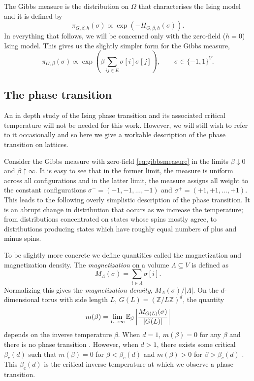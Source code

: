 	The Gibbs measure is the distribution on $\Omega$ that characterises the Ising model and it is defined by
	\begin{equation}
		\pi_{G, \beta, h}(\sigma) \propto \exp(-H_{G, \beta, h}(\sigma)).
		\label{eq:gibbsmeasurefull}
	\end{equation}
	In everything that follows, we will be concerned only with the zero-field ($h = 0$) Ising model. This gives us the slightly simpler form for the Gibbs measure,
	\begin{equation}
		\pi_{G, \beta}(\sigma) \propto \exp \left( \beta \sum_{ij \in E} \sigma[i] \sigma[j] \right), \qquad \sigma \in \{-1, 1\}^V.
		\label{eq:gibbsmeasure}
	\end{equation}

	\subsection{The phase transition}
	\label{sec:the phase transition}
	An in depth study of the Ising phase transition and its associated critical temperature will not be needed for this work. However, we will still wish to refer to it occasionally and so here we give a workable description of the phase transition on lattices.

	Consider the Gibbs measure with zero-field \eqref{eq:gibbsmeasure} in the limits $\beta \downarrow 0$ and $\beta \uparrow \infty$. It is easy to see that in the former limit, the measure is uniform across all configurations and in the latter limit, the measure assigns all weight to the constant configurations $\sigma^- = (-1, -1, \dots, -1)$ and $\sigma^+ = (+1, +1, \dots, +1)$. This leads to the following overly simplistic description of the phase transition. It is an abrupt change in distribution that occurs as we increase the temperature; from distributions concentrated on states whose spins mostly agree, to distributions producing states which have roughly equal numbers of plus and minus spins.

	To be slightly more concrete we define quantities called the magnetization and magnetization density. The \emph{magnetization} on a volume $\Lambda \subseteq V$ is defined as 
	\begin{equation}
		M_\Lambda(\sigma) = \sum_{i \in \Lambda} \sigma[i].
		\label{eq:magnetization on volume definition}
	\end{equation}
	Normalizing this gives the \emph{magnetization density}, $M_\Lambda(\sigma)/|\Lambda|$. On the $d$-dimensional torus with side length $L$, $G(L) = (\mathbb{Z}/L\mathbb{Z})^d$, the quantity
	\begin{equation}
		m(\beta) = \lim_{L \rightarrow \infty} \mathbb{E}_\beta \left|\frac{M_{G(L)}(\sigma)}{|G(L)|} \right|
		\label{eq:limitmagnetizationdensity}
	\end{equation}
	depends on the inverse temperature $\beta$. When $d = 1$, $m(\beta) = 0$ for any $\beta$ and there is no phase transition \cite{Friedli2017-xm}. However, when $d > 1$, there exists some critical $\beta_c(d)$ such that $m(\beta) = 0$ for $\beta < \beta_c(d)$ and $m(\beta) > 0$ for $\beta > \beta_c(d)$ \cite{Friedli2017-xm}. This $\beta_c(d)$ is the critical inverse temperature at which we observe a phase transition.

